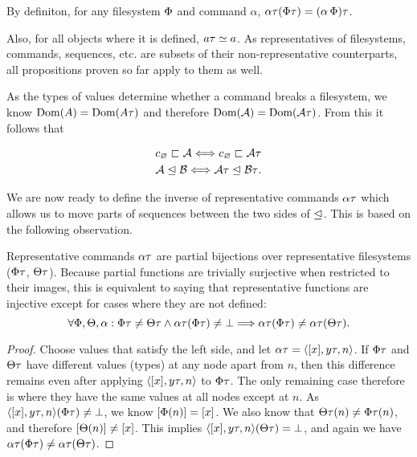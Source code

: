 By definiton,
for any filesystem $\Phi$ and command $\alpha$, 
$\alpha\tau(\Phi\tau) = (\alpha\,\Phi)\tau$.


Also, for all objects where it is defined, $a\tau\simeq a$.
As representatives of filesystems, commands, sequences, etc.
are subsets of their non-representative counterparts, 
all propositions proven so far apply to them as well.


As the types of values determine whether a command breaks a filesystem,
we know $\textrm{Dom}({A})=\textrm{Dom}({A\tau})$ and therefore $\textrm{Dom}({\mathcal{A}})=\textrm{Dom}({\mathcal{A}\tau})$.
From this it follows that

\begin{mycor}\label{repr_works_is_same}
\begin{gather*}
c_\varnothing\sqsubset{\mathcal{A}} \Longleftrightarrow c_\varnothing\sqsubset{\mathcal{A}\tau} \\
{\mathcal{A}}\trianglelefteq{\mathcal{B}} \Longleftrightarrow {\mathcal{A}\tau}\trianglelefteq{\mathcal{B}\tau}.
\end{gather*}
\end{mycor}


We are now ready to define the inverse of representative commands $\alpha\tau$
which allows us to move parts of sequences between the
two sides of $\trianglelefteq$.
This is based on the following observation.

\begin{mylem}\label{repr_comm_inject}
Representative commands $\alpha\tau$ are partial bijections over representative filesystems
($\Phi\tau$, $\Theta\tau$).
Because partial functions are trivially surjective when restricted to their images, this is
equivalent to saying that representative functions are injective except for cases
where they are not defined:
\[ \forall\Phi,\Theta,\alpha: \Phi\tau\neq\Theta\tau \wedge \alpha\tau(\Phi\tau)\neq\bot \Longrightarrow \alpha\tau(\Phi\tau) \neq \alpha\tau(\Theta\tau). \]
\end{mylem}
\begin{proof}
Choose values that satisfy the left side, and let $\alpha\tau = \langle{[x],{y}\tau,n}\rangle$.
If $\Phi\tau$ and $\Theta\tau$ have different values (types) at any node apart from $n$, then this difference remains
even after applying $\langle{[x],{y}\tau,n}\rangle$ to $\Phi\tau$. 
The only remaining case therefore is where they have the same values
at all nodes except at $n$.
As $\langle{[x],{y}\tau,n}\rangle(\Phi\tau)\neq\bot$, we know $[\Phi(n)]=[x]$.
We also know that $\Theta\tau(n)\neq\Phi\tau(n)$, and therefore
$[\Theta(n)]\neq[x]$.
This implies $\langle{[x],{y}\tau,n}\rangle(\Theta\tau)=\bot$,
and again we have $\alpha\tau(\Phi\tau) \neq \alpha\tau(\Theta\tau)$.
\end{proof}


